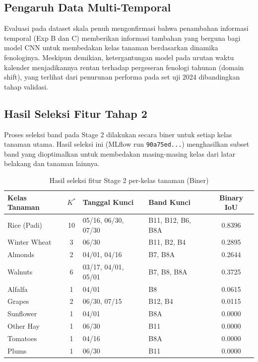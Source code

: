 \subsection{Pengaruh Data Multi-Temporal}

Evaluasi pada dataset skala penuh mengonfirmasi bahwa penambahan informasi temporal (Exp B dan C) 
memberikan informasi tambahan yang berguna bagi model CNN untuk membedakan kelas tanaman 
berdasarkan dinamika fenologinya. Meskipun demikian, ketergantungan model pada urutan waktu 
kalender menjadikannya rentan terhadap pergeseran fenologi tahunan (domain shift), yang 
terlihat dari penurunan performa pada set uji 2024 dibandingkan tahap validasi.

\subsection{Hasil Seleksi Fitur Tahap 2}

Proses seleksi band pada Stage 2 dilakukan secara biner untuk setiap kelas tanaman utama. 
Hasil seleksi ini (MLflow run \texttt{90a75ed...}) menghasilkan subset band yang dioptimalkan 
untuk membedakan masing-masing kelas dari latar belakang dan tanaman lainnya.

\begin{table}[H]
    \centering
    \caption{Hasil seleksi fitur Stage 2 per-kelas tanaman (Biner)}
    \label{tab:stage2_results}
    \begin{tabularx}{\textwidth}{|l|c|X|X|c|}
    \hline
    \textbf{Kelas Tanaman} & \textbf{$K^*$} & \textbf{Tanggal Kunci} & \textbf{Band Kunci} & \textbf{Binary IoU} \\
    \hline
    Rice (Padi)       & 10 & 05/16, 06/30, 07/30 & B11, B12, B6, B8A & 0.8396 \\
    Winter Wheat      & 3  & 06/30               & B11, B2, B4       & 0.2895 \\
    Almonds           & 2  & 04/01, 04/16        & B7, B8A           & 0.2644 \\
    Walnuts           & 6  & 03/17, 04/01, 05/01 & B7, B8, B8A       & 0.3725 \\
    Alfalfa           & 1  & 04/01               & B8                & 0.0615 \\
    Grapes            & 2  & 06/30, 07/15        & B12, B4           & 0.0115 \\
    Sunflower         & 1  & 04/01               & B8A               & 0.0000 \\
    Other Hay         & 1  & 06/30               & B11               & 0.0000 \\
    Tomatoes          & 1  & 04/16               & B8A               & 0.0000 \\
    Plums             & 1  & 06/30               & B11               & 0.0000 \\
    \hline
    \end{tabularx}
\end{table}

